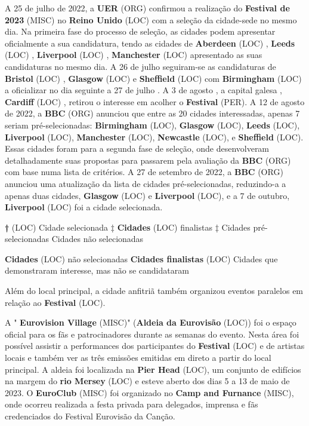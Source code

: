 \documentclass[12pt,a4paper]{article}
\begin{document}
A 25 de julho de 2022, a \textbf{UER} (ORG) confirmou a realização do \textbf{Festival de 2023} (MISC) no \textbf{Reino Unido} (LOC) com a seleção da cidade-sede no mesmo dia. Na primeira fase do processo de seleção, as cidades podem apresentar oficialmente a sua candidatura, tendo as cidades de \textbf{Aberdeen} (LOC) , \textbf{Leeds} (LOC) , \textbf{Liverpool} (LOC) , \textbf{Manchester} (LOC) apresentado as suas candidaturas no mesmo dia. A 26 de julho seguiram-se as candidaturas de \textbf{Bristol} (LOC) , \textbf{Glasgow} (LOC) e \textbf{Sheffield} (LOC) com \textbf{Birmingham} (LOC) a oficializar no dia seguinte a 27 de julho . A 3 de agosto , a capital galesa , \textbf{Cardiff} (LOC) , retirou o interesse em acolher o \textbf{Festival} (PER). A 12 de agosto de 2022, a \textbf{BBC} (ORG) anunciou que entre as 20 cidades interessadas, apenas 7 seriam pré-selecionadas: \textbf{Birmingham} (LOC), \textbf{Glasgow} (LOC), \textbf{Leeds} (LOC), \textbf{Liverpool} (LOC), \textbf{Manchester} (LOC), \textbf{Newcastle} (LOC), e \textbf{Sheffield} (LOC). Essas cidades foram para a segunda fase de seleção, onde desenvolveram detalhadamente suas propostas para passarem pela avaliação da \textbf{BBC} (ORG) com base numa lista de critérios. A 27 de setembro de 2022, a \textbf{BBC} (ORG) anunciou uma atualização da lista de cidades pré-selecionadas, reduzindo-a a apenas duas cidades, \textbf{Glasgow} (LOC) e \textbf{Liverpool} (LOC), e a 7 de outubro, \textbf{Liverpool} (LOC) foi a cidade selecionada.

\textbf{†} (LOC) Cidade selecionada ‡ \textbf{Cidades} (LOC) finalistas ‡ Cidades pré-selecionadas Cidades não selecionadas

\textbf{Cidades} (LOC) não selecionadas \textbf{Cidades finalistas} (LOC) Cidades que demonstraram interesse, mas não se candidataram

Além do local principal, a cidade anfitriã também organizou eventos paralelos em relação ao \textbf{Festival} (LOC).

A " \textbf{Eurovision Village} (MISC)" (\textbf{Aldeia da Eurovisão} (LOC)) foi o espaço oficial para os fãs e patrocinadores durante as semanas do evento. Nesta área foi possível assistir a performances dos participantes do \textbf{Festival} (LOC) e de artistas locais e também ver as três emissões emitidas em direto a partir do local principal. A aldeia foi localizada na \textbf{Pier Head} (LOC), um conjunto de edifícios na margem do \textbf{rio Mersey} (LOC) e esteve aberto dos dias 5 a 13 de maio de 2023. O \textbf{EuroClub} (MISC) foi organizado no \textbf{Camp and Furnance} (MISC), onde ocorreu realizada a festa privada para delegados, imprensa e fãs credenciados do Festival Eurovisão da Canção.
\end{document}
